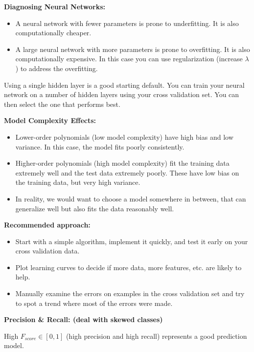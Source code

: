 \documentclass{article}
\begin{document}
\noindent \textbf{Diagnosing Neural Networks:}

\begin{itemize}
\item A neural network with fewer parameters is prone to underfitting. It is also computationally cheaper.
\item A large neural network with more parameters is prone to overfitting. It is also computationally expensive. In this case you can use regularization (increase \(\lambda\)) to address the overfitting.
\end{itemize}

\noindent Using a single hidden layer is a good starting default. You can train your neural network on a number of hidden layers using your cross validation set. You can then select the one that performs best.

\bigskip

\noindent \textbf{Model Complexity Effects:}

\begin{itemize}
\item Lower-order polynomials (low model complexity) have high bias and low variance. In this case, the model fits poorly consistently.
\item Higher-order polynomials (high model complexity) fit the training data extremely well and the test data extremely poorly. These have low bias on the training data, but very high variance.
\item In reality, we would want to choose a model somewhere in between, that can generalize well but also fits the data reasonably well.
\end{itemize}

\noindent \textbf{Recommended approach:}

\begin{itemize}
\item Start with a simple algorithm, implement it quickly, and test it early on your cross validation data.
\item Plot learning curves to decide if more data, more features, etc. are likely to help.
\item Manually examine the errors on examples in the cross validation set and try to spot a trend where most of the errors were made.
\end{itemize}

\noindent \textbf{Precision \& Recall: (deal with skewed classes)}

\noindent High \(F_{score} \in [0, 1]\) (high precision and high recall) represents a good prediction model.
\end{document}
